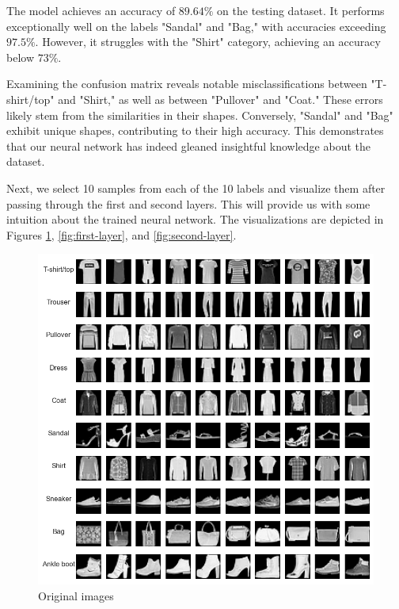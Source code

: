 \documentclass[10pt,a4paper,twoside]{tau}
\begin{document}
The model achieves an accuracy of $89.64\%$ on the testing dataset. It performs exceptionally well on the labels "Sandal" and "Bag," with accuracies exceeding $97.5\%$. However, it struggles with the "Shirt" category, achieving an accuracy below $73\%$.

Examining the confusion matrix reveals notable misclassifications between "T-shirt/top" and "Shirt," as well as between "Pullover" and "Coat." These errors likely stem from the similarities in their shapes. Conversely, "Sandal" and "Bag" exhibit unique shapes, contributing to their high accuracy. This demonstrates that our neural network has indeed gleaned insightful knowledge about the dataset.

Next, we select 10 samples from each of the 10 labels and visualize them after passing through the first and second layers. This will provide us with some intuition about the trained neural network. The visualizations are depicted in Figures \ref{fig:original-image}, \ref{fig:first-layer}, and \ref{fig:second-layer}.

\begin{figure}[htbp]
\centering
\includegraphics[scale=0.43]{images/original_image.png}
\caption{Original images}
\label{fig:original-image}
\end{figure}
\end{document}
